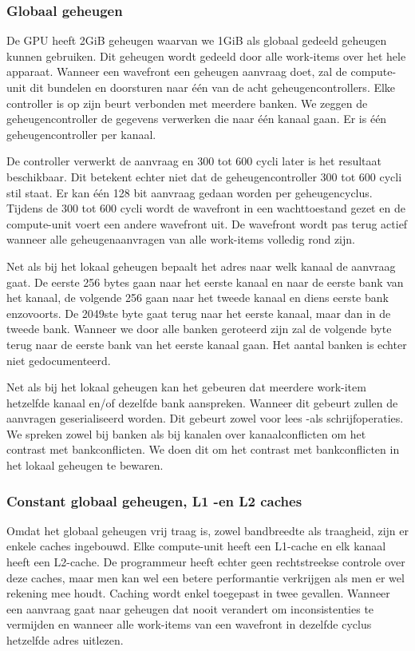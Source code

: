 \subsubsection{Globaal geheugen}
De GPU heeft 2GiB geheugen waarvan we 1GiB als globaal gedeeld geheugen kunnen gebruiken. Dit geheugen wordt gedeeld door alle work-items over het hele apparaat. Wanneer een wavefront een geheugen aanvraag doet, zal de compute-unit dit bundelen en doorsturen naar \'e\'en van de acht geheugencontrollers. Elke controller is op zijn beurt verbonden met meerdere banken. We zeggen de geheugencontroller de gegevens verwerken die naar \'e\'en kanaal gaan. Er is \'e\'en geheugencontroller per kanaal.

De controller verwerkt de aanvraag en 300 tot 600 cycli later is het resultaat beschikbaar. Dit betekent echter niet dat de geheugencontroller 300 tot 600 cycli stil staat. Er kan \'e\'en 128 bit aanvraag gedaan worden per geheugencyclus. Tijdens de 300 tot 600 cycli wordt de wavefront in een wachttoestand gezet en de compute-unit voert een andere wavefront uit. De wavefront wordt pas terug actief wanneer alle geheugenaanvragen van alle work-items volledig rond zijn.

Net als bij het lokaal geheugen bepaalt het adres naar welk kanaal de aanvraag gaat. De eerste 256 bytes gaan naar het eerste kanaal en naar de eerste bank van het kanaal, de volgende 256 gaan naar het tweede kanaal en diens eerste bank enzovoorts. De 2049ste byte gaat terug naar het eerste kanaal, maar dan in de tweede bank. Wanneer we door alle banken geroteerd zijn zal de volgende byte terug naar de eerste bank van het eerste kanaal gaan. Het aantal banken is echter niet gedocumenteerd.

Net als bij het lokaal geheugen kan het gebeuren dat meerdere work-item hetzelfde kanaal en/of dezelfde bank aanspreken. Wanneer dit gebeurt zullen de aanvragen geserialiseerd worden. Dit gebeurt zowel voor lees -als schrijfoperaties. We spreken zowel bij banken als bij kanalen over kanaalconflicten om het contrast met bankconflicten. We doen dit om het contrast met bankconflicten in het lokaal geheugen te bewaren.



\subsubsection{Constant globaal geheugen, L1 -en L2 caches}
Omdat het globaal geheugen vrij traag is, zowel bandbreedte als traagheid, zijn er enkele caches ingebouwd. Elke compute-unit heeft een L1-cache en elk kanaal heeft een L2-cache. De programmeur heeft echter geen rechtstreekse controle over deze caches, maar men kan wel een betere performantie verkrijgen als men er wel rekening mee houdt. Caching wordt enkel toegepast in twee gevallen. Wanneer een aanvraag gaat naar geheugen dat nooit verandert om inconsistenties te vermijden en wanneer alle work-items van een wavefront in dezelfde cyclus hetzelfde adres uitlezen.

